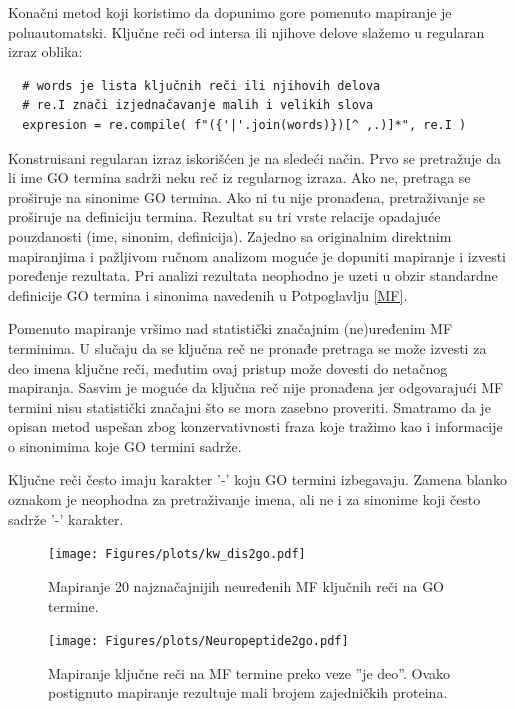 Konačni metod koji koristimo da dopunimo gore pomenuto mapiranje je
poluautomatski. Ključne reči od intersa ili njihove delove slažemo u 
regularan izraz oblika:
\begin{verbatim}
  # words je lista ključnih reči ili njihovih delova
  # re.I znači izjednačavanje malih i velikih slova
  expresion = re.compile( f"({'|'.join(words)})[^ ,.)]*", re.I )
\end{verbatim}
Konstruisani regularan izraz iskorišćen je na sledeći način. Prvo se pretražuje
da li ime GO termina sadrži neku reč iz regularnog izraza. Ako ne, pretraga se
proširuje na  sinonime GO termina. Ako ni tu nije pronađena, pretraživanje se
proširuje na definiciju termina. Rezultat su tri vrste relacije opadajuće
pouzdanosti (ime, sinonim, definicija). Zajedno sa originalnim direktnim
mapiranjima i pažljivom ručnom analizom moguće je dopuniti mapiranje i izvesti
poređenje rezultata. Pri analizi rezultata neophodno je uzeti u obzir
standardne definicije GO termina i sinonima navedenih u Potpoglavlju \ref{MF}.

Pomenuto mapiranje vršimo nad statistički značajnim (ne)uređenim MF
terminima.  U slučaju da se ključna reč ne pronađe pretraga se može izvesti za
deo imena ključne reči, međutim ovaj pristup može dovesti do netačnog
mapiranja. Sasvim je moguće da ključna reč nije pronađena jer odgovarajući MF
termini nisu statistički značajni što se mora zasebno proveriti. Smatramo da je
opisan metod uspešan zbog konzervativnosti fraza koje tražimo kao i informacije
o sinonimima koje GO termini sadrže.

Ključne reči često imaju karakter '-' koju GO termini izbegavaju. Zamena blanko
oznakom je neophodna za pretraživanje imena, ali ne i za sinonime koji često
sadrže '-' karakter. 

\begin{figure}[th]
\hspace*{-2.2cm} 
\texttt{[image: Figures/plots/kw\_dis2go.pdf]}
\decoRule
\caption {
  Mapiranje 20 najznačajnijih neuređenih MF ključnih reči \parencite{Xie2007} 
  na GO termine.
}
\label{fig:KWtop20dis}
\end{figure}

\begin{figure}[th]
\centering
\hspace*{-1.0cm} 
\texttt{[image: Figures/plots/Neuropeptide2go.pdf]}
\decoRule
\caption {
  Mapiranje ključne reči  na MF termine preko veze ''je deo''.
  Ovako postignuto mapiranje rezultuje mali brojem zajedničkih proteina.
}
\label{fig:neuropeptide}
\end{figure}
